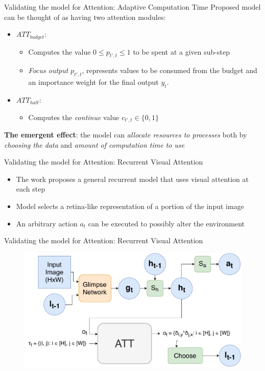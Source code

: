 \documentclass[10pt]{beamer}
\begin{document}
\begin{frame}{Validating the model for Attention: Adaptive Computation Time}
    Proposed model can be thought of as having two attention modules:
    \begin{itemize}
        \item \textbf{$ATT_{budget}$}:
            \begin{itemize}
                \item Computes the value $0 \le p_{t',t} \le 1$ to be spent at a given sub-step
                \item \emph{Focus output} $p_{t',t}$, represents values to be consumed from the budget and
                    an importance weight for the final output $y_t$.
            \end{itemize}
        \item \textbf{$ATT_{halt}$}:
            \begin{itemize}
                \item Computes the \emph{continue} value $c_{t',t} \in \{0, 1\}$
            \end{itemize}
    \end{itemize}
    \textbf{The emergent effect}:
    the model can \emph{allocate resources to processes} both by
    \emph{choosing the data} and \emph{amount of computation time to use}
\end{frame}

\begin{frame}{Validating the model for Attention: Recurrent Visual Attention}
    \begin{itemize}
        \item The work proposes a general recurrent model that uses visual attention at each step
        \item Model selects a retina-like representation of a portion of the input image
        \item An arbitrary action $a_t$ can be executed to possibly alter the environment
    \end{itemize}
\end{frame}

\begin{frame}{Validating the model for Attention: Recurrent Visual Attention}
    \begin{figure}[H]
        \centering
        \includegraphics[width=0.9\linewidth]{./img/ram.pdf}
    \end{figure}
\end{frame}
\end{document}
